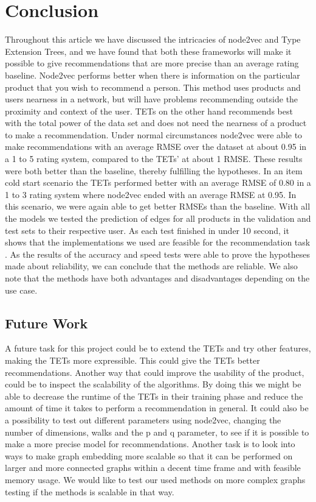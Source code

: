 \section{Conclusion}\label{Sec:Conclusion}
Throughout this article we have discussed the intricacies of node2vec and Type Extension Trees, and we have found that both these frameworks will make it possible to give recommendations that are more precise than an average rating baseline.
Node2vec performs better when there is information on the particular product that you wish to recommend a person.
This method uses products and users nearness in a network, but will have problems recommending outside the proximity and context of the user.
TETs on the other hand recommends best with the total power of the data set and does not need the nearness of a product to make a recommendation.
Under normal circumstances node2vec were able to make recommendations with an average RMSE over the dataset at about 0.95 in a 1 to 5 rating system, compared to the TETs' at about 1 RMSE.
These results were both better than the baseline, thereby fulfilling the hypotheses.
In an item cold start scenario the TETs performed better with an average RMSE of 0.80 in a 1 to 3 rating system where node2vec ended with an average RMSE at 0.95.
In this scenario, we were again able to get better RMSEs than the baseline.
With all the models we tested  the prediction of edges for all products in the validation and test sets to their respective user.
As each test finished in under 10 second, it shows that the implementations we used are feasible for the recommendation task .
As the results of the accuracy and speed tests were able to prove the hypotheses made about reliability, we can conclude that the methods are reliable.
We also note that the methods have both advantages and disadvantages depending on the use case.

\subsection{Future Work}
A future task for this project could be to extend the TETs and try other features, making the TETs more expressible. This could give the TETs better recommendations.
Another way that could improve the usability of the product, could be to inspect the scalability of the algorithms.
By doing this we might be able to decrease the runtime of the TETs in their training phase and reduce the amount of time it takes to perform a recommendation in general.
It could also be a possibility to test out different parameters using node2vec, changing the number of dimensions, walks and the p and q parameter, to see if it is possible to make a more precise model for recommendations.
Another task is to look into ways to make graph embedding more scalable so that it can be performed on larger and more connected graphs within a decent time frame and with feasible memory usage.
We would like to test our used methods on more complex graphs testing if the methods is scalable in that way.
